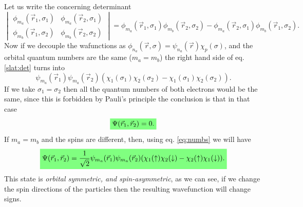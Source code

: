 \begin{questions}
\begin{solution}
Let us write the concerning determinant
\begin{equation}
  \begin{vmatrix}
     \phi_{m_a}(\vec{r}_1,\sigma_1) & \phi_{m_a}(\vec{r}_2,\sigma_1)\\
     \phi_{m_b}(\vec{r}_1,\sigma_2) & \phi_{m_b}(\vec{r}_2,\sigma_2)
  \end{vmatrix} = \phi_{m_a}(\vec{r}_1,\sigma_1)\phi_{m_b}(\vec{r}_2,\sigma_2) - \phi_{m_a}(\vec{r}_2,\sigma_1)\phi_{m_b}(\vec{r}_1,\sigma_2).
  \label{slat:det}
\end{equation}
Now if we decouple the wafunctions as $\phi_{n_a}(\vec{r},\sigma) = \psi_{n_a}(\vec{r})\chi_p(\sigma)$, and the orbital quantum numbers are the same ($m_a = m_b$) the right hand side of eq. \ref{slat:det} turns into
\begin{equation}
  \psi_{m_a}(\vec{r}_1)\psi_{m_a}(\vec{r}_2)(\chi_1(\sigma_1)\chi_2(\sigma_2) - \chi_1(\sigma_1)\chi_2(\sigma_2)).
  \label{eq:numbs}
\end{equation}
If we take $\sigma_1 = \sigma_2$ then all the quantum numbers of both electrons would be the same, since this is forbidden by Pauli's principle the conclusion is that in that case
\begin{equation*}
  \hlgreen{\Psi(\vec{r}_1,\vec{r}_2) = 0.}
\end{equation*}
If $m_a = m_b$ and the spins are different, then, using eq. \ref{eq:numbs} we will have
\begin{equation*}
  \hlgreen{\Psi(\vec{r}_1,\vec{r}_2) = \frac{1}{\sqrt{2}} \psi_{m_a}(\vec{r}_1)\psi_{m_a}(\vec{r}_2)(\chi_1(\uparrow)\chi_2(\downarrow) - \chi_2(\uparrow)\chi_1(\downarrow)).}
\end{equation*}
This state is \textit{orbital symmetric, and spin-asymmetric}, as we can see, if we change the spin directions of the particles then the resulting wavefunction will change signs.


\end{solution}
\end{questions}
